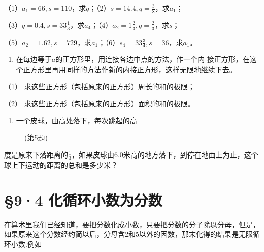 （1）\(a_{1} = 66, s = 110\)，求\(q\)；（2）\(s = 14.4, q = \frac{3}{8}\)，求\(a_{1}\)；

（3）\(q = 0.4, s = 33\frac{1}{3}\)，求\(a_4\)；（4）\(a_2 = 1\frac{2}{3}, q = \frac{2}{3}\)，求\(s\)；

（5）\(a_{2} = 1.62, s = 729\)，求\(a_{1}\)；（6）\(s_{4} = 33\frac{3}{4}, s = 36\)，求\(a_{1}\)。

\begin{enumerate}[start=5]
\item
  在每边等于\(a\)的正方形里，用连接各边中点的方法，作一个内
  接正方形，在这个正方形里再用同样的方法作新的内接正方形，这样无限地继续下去。
\end{enumerate}

（1） 求这些正方形（包括原来的正方形）周长的和的极限；

（2） 求这些正方形（包括原来的正方形）面积的和的极限。

\begin{enumerate}[start=6]
\item
  一个皮球，由高处落下，每次跳起的高
\end{enumerate}

\begin{figure}
\centering
\caption{(第5题)}
\end{figure}


度是原来下落距离的\(\frac{1}{3}\)，如果皮球由6.0米高的地方落下，到停在地面上为止，这个球上下运动的距离的总和是多少米？

\section{§9·4 化循环小数为分数}

在算术里我们已经知道，要把分数化成小数，只要把分数的分子除以分母，但是，如果原来这个分数经约简以后，分母含2和5以外的因数，那末化得的结果是无限循环小数.例如

